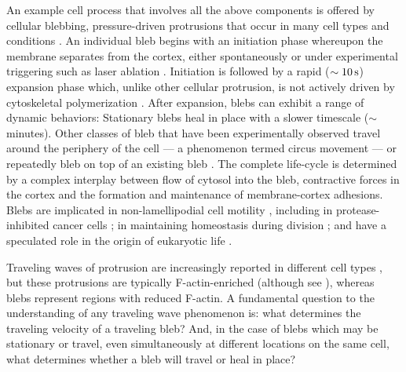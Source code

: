 An example cell process that involves all the above components is offered by cellular blebbing, pressure-driven  protrusions that occur in many cell types and conditions \cite{Charras:2008ic,Charras:2008bz,Paluch:2013ea}. An individual bleb begins with an initiation phase whereupon the membrane separates from the cortex, either spontaneously or under experimental triggering such as laser ablation \cite{Clark:2013ef, Charras:2008ic}. Initiation is followed by a rapid ($\sim10\,\mbox{s}$) expansion phase which, unlike other cellular protrusion, is not actively driven by cytoskeletal polymerization \cite{Danuser:2012dr}. After expansion, blebs can exhibit a range of dynamic behaviors: Stationary blebs heal in place with a slower timescale ($\sim$minutes). Other classes of bleb that have been experimentally observed travel around the periphery of the cell --- a phenomenon termed circus movement \cite{Fujinami:1975vo,Anonymous:4HHO02bL,Lim:2012fz} --- or repeatedly bleb on top of an existing bleb \cite{Charras:2008ic}. The complete life-cycle is determined by a complex interplay between flow of cytosol into the bleb, contractive forces in the cortex and the formation and maintenance of membrane-cortex adhesions.
Blebs are implicated in non-lamellipodial cell motility \cite{Logue:2015jj,Charras:2008gf}, including in protease-inhibited cancer cells \cite{Friedl:2003if}; in maintaining homeostasis during division \cite{Sedzinski:2011ef}; and have a speculated role in the origin of eukaryotic life \cite{Baum:2014ee}.

Traveling waves of protrusion are increasingly reported in different cell types \cite{Weiner:2007gd,Ryan:2012ej}, but these protrusions are typically F-actin-enriched (although see \cite{Kapustina:2013gc}), whereas blebs represent regions with reduced F-actin.
A fundamental question to the understanding of any traveling wave phenomenon \cite{Allard:2012if} is: what determines the traveling velocity of a traveling bleb? And, in the case of blebs which may be stationary or travel, even simultaneously at different locations on the same cell, what determines whether a bleb will travel or heal in place? 

